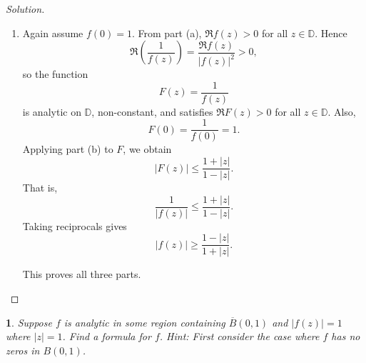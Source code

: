 \documentclass[12pt, a4paper]{report}
\theoremstyle{spaced}
\newtheorem{exercise}{}
\newcommand{\setexercise}[1]{\setcounter{exercise}{#1-1}}
\begin{document}
\begin{proof}[Solution]
\begin{enumerate}[label=(\alph*)]
		\item Again assume \(f(0)=1\). From part (a), \(\Re f(z)>0\) for all \(z\in\mathbb D\). Hence
		      \[
			      \Re\!\left(\frac{1}{f(z)}\right)
			      = \frac{\Re f(z)}{|f(z)|^2}>0,
		      \]
		      so the function
		      \[
			      F(z)=\frac{1}{f(z)}
		      \]
		      is analytic on \(\mathbb D\), non-constant, and satisfies \(\Re F(z)>0\) for all \(z\in\mathbb D\). Also,
		      \[
			      F(0)=\frac{1}{f(0)}=1.
		      \]
		      Applying part (b) to \(F\), we obtain
		      \[
			      |F(z)|\le \frac{1+|z|}{1-|z|}.
		      \]
		      That is,
		      \[
			      \frac{1}{|f(z)|}\le \frac{1+|z|}{1-|z|}.
		      \]
		      Taking reciprocals gives
		      \[
			      |f(z)|\ge \frac{1-|z|}{1+|z|}.
		      \]

		      This proves all three parts.
	\end{enumerate}
\end{proof}

\setexercise{6}
\begin{exercise}
	Suppose $f$ is analytic in some region containing $\overline{B}(0,1)$ and $|f(z)|=1$ where $|z|=1$.
	Find a formula for $f$. Hint: First consider the case where $f$ has no zeros in $B(0,1)$.
\end{exercise}
\end{document}
